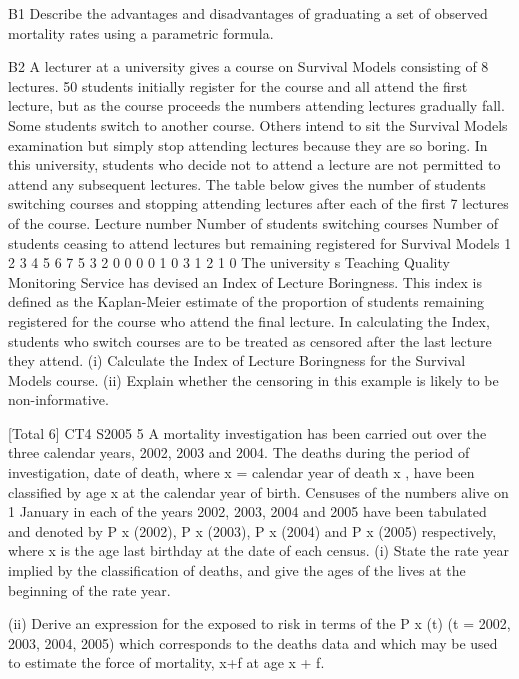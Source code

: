 \documentclass[a4paper,12pt]{article}
\begin{document}
\begin{enumerate}

B1 Describe the advantages and disadvantages of graduating a set of observed mortality
rates using a parametric formula.

B2 A lecturer at a university gives a course on Survival Models consisting of 8 lectures.
50 students initially register for the course and all attend the first lecture, but as the
course proceeds the numbers attending lectures gradually fall.
Some students switch to another course. Others intend to sit the Survival Models
examination but simply stop attending lectures because they are so boring. In this
university, students who decide not to attend a lecture are not permitted to attend any
subsequent lectures.
The table below gives the number of students switching courses and stopping
attending lectures after each of the first 7 lectures of the course.
Lecture
number Number of students
switching courses Number of students ceasing to
attend lectures but remaining
registered for Survival Models
1
2
3
4
5
6
7 5
3
2
0
0
0
0 1
0
3
1
2
1
0
The university s Teaching Quality Monitoring Service has devised an Index of
Lecture Boringness. This index is defined as the Kaplan-Meier estimate of the
proportion of students remaining registered for the course who attend the final lecture.
In calculating the Index, students who switch courses are to be treated as censored
after the last lecture they attend.
(i) Calculate the Index of Lecture Boringness for the Survival Models course. 
(ii) Explain whether the censoring in this example is likely to be non-informative.

[Total 6]
CT4 S2005
5
A mortality investigation has been carried out over the three calendar years, 2002,
2003 and 2004.
The deaths during the period of investigation,
date of death, where
x = calendar year of death
x ,
have been classified by age x at the
calendar year of birth.
Censuses of the numbers alive on 1 January in each of the years 2002, 2003, 2004 and
2005 have been tabulated and denoted by
P x (2002), P x (2003), P x (2004) and P x (2005)
respectively, where x is the age last birthday at the date of each census.
(i) State the rate year implied by the classification of deaths, and give the ages of
the lives at the beginning of the rate year.

(ii) Derive an expression for the exposed to risk in terms of the P x (t) (t = 2002,
2003, 2004, 2005) which corresponds to the deaths data and which may be
used to estimate the force of mortality, x+f at age x + f.


\end{enumerate}
\end{document}

